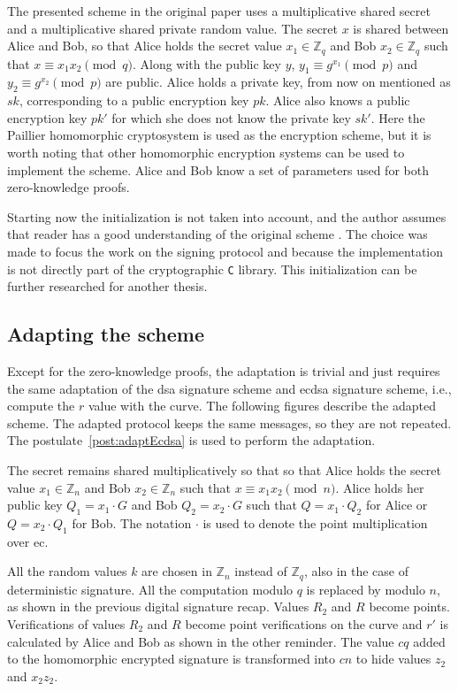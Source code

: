 The presented scheme in the original paper uses a multiplicative shared secret
and a multiplicative shared private random value. The secret $x$ is shared
between Alice and Bob, so that Alice holds the secret value $x_1 \in
\mathbb{Z}_{q}$ and Bob $x_2 \in \mathbb{Z}_{q}$ such that $x \equiv x_1x_2
\pmod q$. Along with the public key $y$, $y_1 \equiv g^{x_1} \pmod p$ and $y_2
\equiv g^{x_2} \pmod p$ are public. Alice holds a private key, from now on
mentioned as $sk$, corresponding to a public encryption key $pk$. Alice also
knows a public encryption key $pk'$ for which she does not know the private key
$sk'$. Here the Paillier homomorphic cryptosystem is used as the encryption
scheme, but it is worth noting that other homomorphic encryption systems can be
used to implement the scheme. Alice and Bob know a set of parameters used for
both zero-knowledge proofs.

Starting now the initialization is not taken into account, and the author
assumes that reader has a good understanding of the original scheme
\cite{crypto-2001-1592}. The choice was made to focus the work on the
signing protocol and because the implementation is not directly part of the
cryptographic \texttt{C} library. This initialization can be further researched
for another thesis.

\subsection{Adapting the scheme}

Except for the zero-knowledge proofs, the adaptation is trivial and just requires
the same adaptation of the \gls{dsa} signature scheme and \gls{ecdsa} signature
scheme, i.e., compute the $r$ value with the curve. The following figures
describe the adapted scheme. The adapted protocol keeps the same messages, so
they are not repeated. The postulate~\ref{post:adaptEcdsa} is used to perform
the adaptation.

The secret remains shared multiplicatively so that so that Alice holds the secret
value $x_1 \in \mathbb{Z}_{n}$ and Bob $x_2 \in \mathbb{Z}_{n}$ such that $x
\equiv x_1x_2 \pmod n$. Alice holds her public key $Q_1 = x_1 \cdot G$ and Bob
$Q_2 = x_2 \cdot G$ such that $Q = x_1 \cdot Q_2$ for Alice or $Q = x_2 \cdot
Q_1$ for Bob. The notation $\cdot$ is used to denote the point multiplication
over \gls{ec}.

All the random values $k$ are chosen in $\mathbb{Z}_{n}$ instead of
$\mathbb{Z}_{q}$, also in the case of deterministic signature. All the
computation modulo $q$ is replaced by modulo $n$, as shown in the previous
digital signature recap. Values $R_2$ and $R$ become points. Verifications of
values $R_2$ and $R$ become point verifications on the curve and $r'$ is
calculated by Alice and Bob as shown in the other reminder. The value $cq$ added
to the homomorphic encrypted signature is transformed into $cn$ to hide values
$z_2$ and $x_2z_2$.


